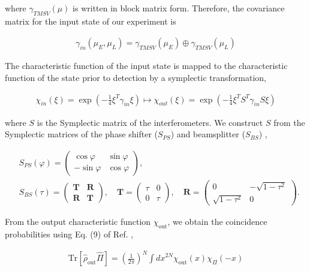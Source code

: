 \documentclass[11pt]{caltech_thesis} %
\begin{document}
where $\gamma_{TMSV}(\mu)$ is written in block matrix form. Therefore, the covariance matrix for the input state of our experiment is

\begin{align}
    \gamma_{in}(\mu_E,\mu_L) = \gamma_{TMSV}(\mu_E)\oplus \gamma_{TMSV}(\mu_L)
\end{align}

The characteristic function of the input state is mapped to the characteristic function of the state prior to detection by a symplectic transformation,

\begin{align}
    \chi_{in}(\xi) = \exp(-\frac{1}{4}\xi^T\gamma_{in} \xi)\mapsto \chi_{out}(\xi) = \exp(-\frac{1}{4}\xi^T S^T \gamma_{in}S \xi)
\end{align}

where $S$ is the Symplectic matrix of the interferometers. We construct $S$ from the Symplectic matrices of the phase shifter ($S_{PS}$) and beamsplitter ($S_{BS}$) \autocite{takeoka2015full},

\begin{align}
    &S_{PS}(\varphi) = \begin{pmatrix}
        \cos{\varphi}&\sin{\varphi}\\
        -\sin{\varphi}&\cos{\varphi}
    \end{pmatrix},\\
    &S_{BS}(\tau) = 
    \begin{pmatrix}
    \mathbf{T}&\mathbf{R}\\
    \mathbf{R}&\mathbf{T}
    \end{pmatrix}, \quad
    \mathbf{T}=\begin{pmatrix}
        \tau&0\\
        0&\tau
    \end{pmatrix}, \quad \mathbf{R}=
    \begin{pmatrix}
    0&-\sqrt{1-\tau^2}\\
    \sqrt{1-\tau^2}&0
    \end{pmatrix}.
\end{align}

From the output characteristic function $\chi_{\text{out}}$, we obtain the coincidence probabilities using Eq. (9) of Ref. \autocite{Davis2022},

\begin{align}
    \text{Tr}\left[\hat{\rho}_{\text{out}}\hat{\Pi}\right] = \left(\frac{1}{2\pi}\right)^N \int {dx}^{2N}\chi_{\text{out}} (x) \chi_\Pi (-x)
\end{align}
\end{document}
